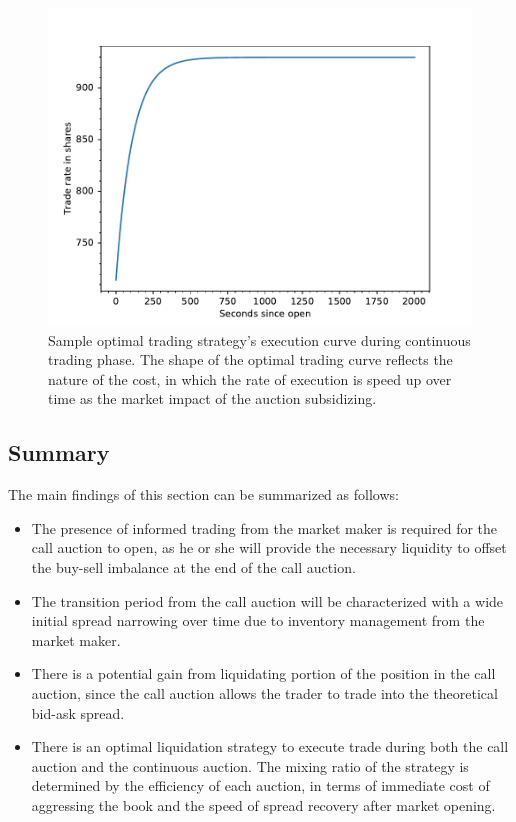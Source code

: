 \documentclass{article}
\begin{document}
\begin{figure}[h]
  \includegraphics[width=\textwidth]{SampleTradeCurve}
  \caption{Sample optimal trading strategy's execution curve during continuous trading phase. The shape of the optimal trading curve reflects the nature of the cost, in which the rate of execution is speed up over time as the market impact of the auction subsidizing.}
  \label{fig:optimal_curve_strategy}
\end{figure}

\subsection{Summary}

The main findings of this section can be summarized as follows:

\begin{itemize}
  \item The presence of informed trading from the market maker is required for the call auction to open, as he or she will provide the necessary liquidity to offset the buy-sell imbalance at the end of the call auction.
  \item The transition period from the call auction will be characterized with a wide initial spread narrowing over time due to inventory management from the market maker.
  \item There is a potential gain from liquidating portion of the position in the call auction, since the call auction allows the trader to trade into the theoretical bid-ask spread.
  \item There is an optimal liquidation strategy to execute trade during both the call auction and the continuous auction. The mixing ratio of the strategy is determined by the efficiency of each auction, in terms of immediate cost of aggressing the book and the speed of spread recovery after market opening.
\end{itemize}
\end{document}
